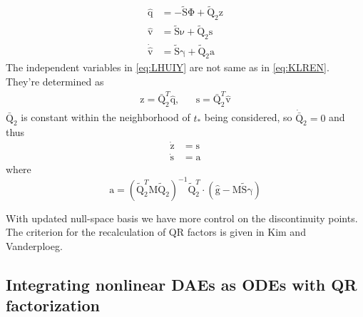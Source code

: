 \documentclass{scrartcl}
\newcommand\mMat[1]{\ensuremath{\boldsymbol{\mathrm{#1}}}}
\newcommand\mVec[1]{\ensuremath{\boldsymbol{\mathrm{#1}}}}
\begin{document}
\begin{subequations}
\label{eq:LHUIY}
\begin{align}
  \mVec{\hat q}
  & = - \mMat{\tilde S} \mVec{\Phi} + \mMat{\tilde Q}_2 \mVec{z}
  \label{eq:NUYW4}
\\
  \mVec{\hat v}
  & = \mMat{\tilde S} \mVec{\nu} + \mMat{\tilde Q}_2 \mVec{s}
  \label{eq:FQVW3}
\\
  \mVec{\dot {\hat v}}
  & = \mMat{\tilde S} \mVec{\gamma} + \mMat{\tilde Q}_2 \mVec{a}
  \label{eq:JF01O}
\end{align}
\end{subequations}
The independent variables in \eqref{eq:LHUIY} are not same as in
\eqref{eq:KLREN}. They're determined as
\begin{align}
  & \mVec{z} = \mMat{\bar Q}_2^T \mVec{\hat q}, &
  & \mVec{s} = \mMat{\bar Q}_2^T \mVec{\hat v} &
  \label{eq:71BJ}
\end{align}
$\mMat{\bar Q}_2$ is constant within the neighborhood of $t_{*}$ being
considered, so $\mMat{\dot {\bar Q}}_2 = \mMat{0}$ and thus
\begin{subequations}
\begin{align}
  \mVec{\dot z} & = \mVec{s}
\\
\mVec{\dot s} & = \mVec{a}
\end{align}
\end{subequations}
where
\begin{equation}
  \mVec{a} = \left(\mMat{\tilde Q}_2^T \mMat{M} \mMat{\tilde Q}_2\right)^{-1}
  \mMat{\tilde Q}_2^T \cdot \left(
      \mVec{\hat g}
    - \mMat{M} \mMat{\tilde S} \mVec{\gamma}
  \right)
\end{equation}

With updated null-space basis we have more control on the discontinuity points.
The criterion for the recalculation of QR factors is given in Kim and
Vanderploeg.

\subsection{Integrating nonlinear DAEs as ODEs with QR factorization}
\end{document}
